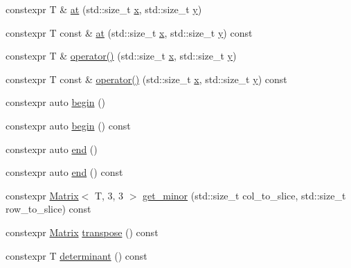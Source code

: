 \begin{DoxyCompactItemize}
\item 
constexpr T \& \mbox{\hyperlink{class_saturn_1_1_math_1_1_matrix_3_01_t_00_014_00_014_01_4_aa1b90632337988e9c3b9f38ddb74e38e}{at}} (std\+::size\+\_\+t \mbox{\hyperlink{glad_8h_a3dddca64560508b8d5bd9ee938e2d3a3}{x}}, std\+::size\+\_\+t \mbox{\hyperlink{glad_8h_a12b33d8afd2f771e63a85ea45a440c64}{y}})
\item 
constexpr T const  \& \mbox{\hyperlink{class_saturn_1_1_math_1_1_matrix_3_01_t_00_014_00_014_01_4_a95802964e35ca5abbe0cbe5dfcdf7469}{at}} (std\+::size\+\_\+t \mbox{\hyperlink{glad_8h_a3dddca64560508b8d5bd9ee938e2d3a3}{x}}, std\+::size\+\_\+t \mbox{\hyperlink{glad_8h_a12b33d8afd2f771e63a85ea45a440c64}{y}}) const
\item 
constexpr T \& \mbox{\hyperlink{class_saturn_1_1_math_1_1_matrix_3_01_t_00_014_00_014_01_4_a9cd002a975095ab960c1ab159e35498c}{operator()}} (std\+::size\+\_\+t \mbox{\hyperlink{glad_8h_a3dddca64560508b8d5bd9ee938e2d3a3}{x}}, std\+::size\+\_\+t \mbox{\hyperlink{glad_8h_a12b33d8afd2f771e63a85ea45a440c64}{y}})
\item 
constexpr T const  \& \mbox{\hyperlink{class_saturn_1_1_math_1_1_matrix_3_01_t_00_014_00_014_01_4_a7f7cc93145fe78d71bc5dce4799757a5}{operator()}} (std\+::size\+\_\+t \mbox{\hyperlink{glad_8h_a3dddca64560508b8d5bd9ee938e2d3a3}{x}}, std\+::size\+\_\+t \mbox{\hyperlink{glad_8h_a12b33d8afd2f771e63a85ea45a440c64}{y}}) const
\item 
constexpr auto \mbox{\hyperlink{class_saturn_1_1_math_1_1_matrix_3_01_t_00_014_00_014_01_4_aa4a6c048565150e951229dcb914a0520}{begin}} ()
\item 
constexpr auto \mbox{\hyperlink{class_saturn_1_1_math_1_1_matrix_3_01_t_00_014_00_014_01_4_a90ce388e9ccf6a30b1a9afed1c96f0b0}{begin}} () const
\item 
constexpr auto \mbox{\hyperlink{class_saturn_1_1_math_1_1_matrix_3_01_t_00_014_00_014_01_4_a3f8ba840869e409309ed77cbe17f32cf}{end}} ()
\item 
constexpr auto \mbox{\hyperlink{class_saturn_1_1_math_1_1_matrix_3_01_t_00_014_00_014_01_4_a40b86aa13fe4d7d478176f2a6357d98e}{end}} () const
\item 
constexpr \mbox{\hyperlink{class_saturn_1_1_math_1_1_matrix}{Matrix}}$<$ T, 3, 3 $>$ \mbox{\hyperlink{class_saturn_1_1_math_1_1_matrix_3_01_t_00_014_00_014_01_4_ade7a3b8f5601fd1cabd9833d4a15cab0}{get\+\_\+minor}} (std\+::size\+\_\+t col\+\_\+to\+\_\+slice, std\+::size\+\_\+t row\+\_\+to\+\_\+slice) const
\item 
constexpr \mbox{\hyperlink{class_saturn_1_1_math_1_1_matrix}{Matrix}} \mbox{\hyperlink{class_saturn_1_1_math_1_1_matrix_3_01_t_00_014_00_014_01_4_a3bd3f8ea6b95ad010bb33daf5d25bb4b}{transpose}} () const
\item 
constexpr T \mbox{\hyperlink{class_saturn_1_1_math_1_1_matrix_3_01_t_00_014_00_014_01_4_a0f3e9b87c60de32277ca43935f357227}{determinant}} () const
\end{DoxyCompactItemize}
